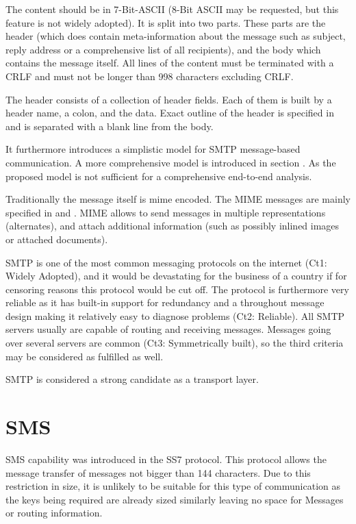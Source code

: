 \documentclass[a4paper,appendixprefix,pdfusetitle,twocolumn,fontsize=8pt,draft,DIV=calc]{scrbook}
\begin{document}
The content should be in 7-Bit-ASCII (8-Bit ASCII may be requested, but this feature is not widely adopted). It is split into two parts. These parts are the header (which does contain meta-information about the message such as subject, reply address or a comprehensive list of all recipients), and the body which contains the message itself. All lines of the content must be terminated with a CRLF and must not be longer than 998 characters excluding CRLF.

The header consists of a collection of header fields. Each of them is built by a header name, a colon, and the data. Exact outline of the header is specified in \cite{RFC5322} and is separated with a blank line from the body. 

It \cite{RFC5321} furthermore introduces a simplistic model for SMTP message-based communication. A more comprehensive model is introduced in section . As the proposed model is not sufficient for a comprehensive end-to-end analysis.

Traditionally the message itself is mime encoded. The MIME messages are mainly specified in \cite{RFC2045} and \cite{RFC2046}. MIME allows to send messages in multiple representations (alternates), and attach additional information (such as possibly inlined images or attached documents). 

SMTP is one of the most common messaging protocols on the internet (Ct1: Widely Adopted), and it would be devastating for the business of a country if for censoring reasons this protocol would be cut off. The protocol is furthermore very reliable as it has built-in support for redundancy and a throughout message design making it relatively easy to diagnose problems (Ct2: Reliable). All SMTP servers usually are capable of routing and receiving messages. Messages going over several servers are common (Ct3: Symmetrically built), so the third criteria may be considered as fulfilled as well.

SMTP is considered a strong candidate as a transport layer.  

\section{SMS}
SMS capability was introduced in the SS7 protocol. This protocol allows the message transfer of messages not bigger than 144 characters. Due to this restriction in size, it is unlikely to be suitable for this type of communication as the keys being required are already sized similarly leaving no space for Messages or routing information.
\end{document}

